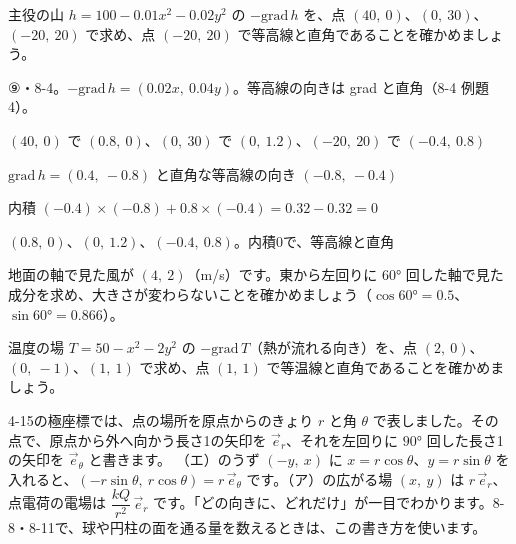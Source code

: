 \begin{reidai}[勾配の場をかく]
主役の山 $h=100-0.01x^2-0.02y^2$ の $-\mathrm{grad}\,h$ を、点 $(40,\ 0)$、$(0,\ 30)$、$(-20,\ 20)$ で求め、点 $(-20,\ 20)$ で等高線と直角であることを確かめましょう。\par
\kangaekata ⑨・8-4。$-\mathrm{grad}\,h=(0.02x,\ 0.04y)$。等高線の向きは grad と直角（8-4 例題4）。\par
\shiki\kviiifs{}\zw{} $(40,\ 0)$ で $(0.8,\ 0)$、$(0,\ 30)$ で $(0,\ 1.2)$、$(-20,\ 20)$ で $(-0.4,\ 0.8)$\par
\kviiifa $\mathrm{grad}\,h=(0.4,\ -0.8)$ と直角な等高線の向き $(-0.8,\ -0.4)$\par
\kviiifa 内積 $(-0.4)\times(-0.8)+0.8\times(-0.4)=0.32-0.32=0$\par
\kotae\kviiifs{}\zw{} $(0.8,\ 0)$、$(0,\ 1.2)$、$(-0.4,\ 0.8)$。内積0で、等高線と直角
\end{reidai}

\begingroup{}%
\noindent\begin{minipage}[t]{0.485\linewidth}\vspace{0pt}
\begin{jibun}
\raggedright 地面の軸で見た風が $(4,\ 2)$（m/s）です。東から左回りに $60°$ 回した軸で見た成分を求め、大きさが変わらないことを確かめましょう（$\cos60°=0.5$、$\sin60°=0.866$）。
\end{jibun}
\end{minipage}\hfill
\begin{minipage}[t]{0.485\linewidth}\vspace{0pt}
\begin{jibun}
\raggedright 温度の場 $T=50-x^2-2y^2$ の $-\mathrm{grad}\,T$（熱が流れる向き）を、点 $(2,\ 0)$、$(0,\ -1)$、$(1,\ 1)$ で求め、点 $(1,\ 1)$ で等温線と直角であることを確かめましょう。
\end{jibun}
\end{minipage}\par
\endgroup

\begin{motto}[4]
4-15の極座標では、点の場所を原点からのきょり $r$ と角 $\theta$ で表しました。その点で、原点から外へ向かう長さ1の矢印を $\vec e_r$、それを左回りに $90°$ 回した長さ1の矢印を $\vec e_\theta$ と書きます。
（エ）のうず $(-y,\ x)$ に $x=r\cos\theta$、$y=r\sin\theta$ を入れると、$(-r\sin\theta,\ r\cos\theta)=r\,\vec e_\theta$ です。（ア）の広がる場 $(x,\ y)$ は $r\,\vec e_r$、点電荷の電場は $\dfrac{kQ}{r^2}\,\vec e_r$ です。「どの向きに、どれだけ」が一目でわかります。8-8・8-11で、球や円柱の面を通る量を数えるときは、この書き方を使います。
\end{motto}

